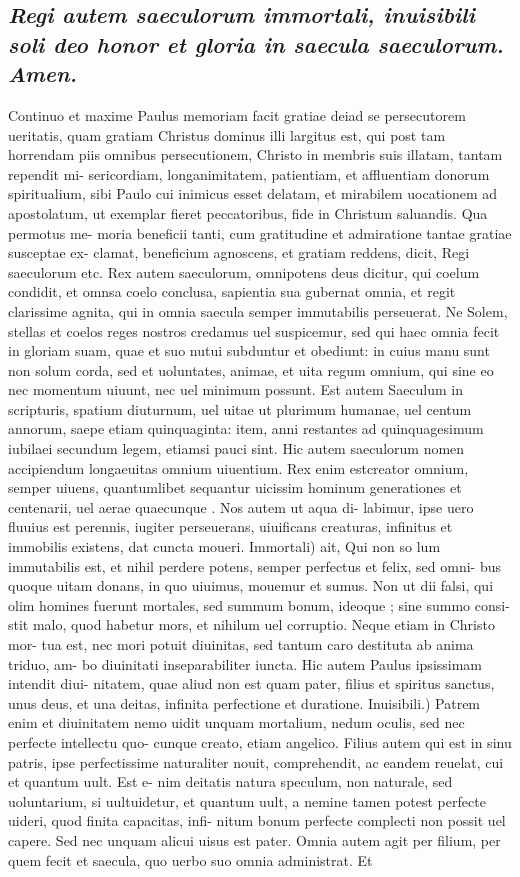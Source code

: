 \documentclass{article}
\begin{document}
\begin{pages}
\subsection*{\textit{Regi autem saeculorum immortali, inuisibili soli deo honor et gloria in saecula saeculorum. Amen. }}\pstart Continuo et maxime Paulus memoriam facit gratiae deiad se persecutorem ueritatis, quam gratiam Christus dominus illi largitus est, qui post tam horrendam piis omnibus persecutionem, Christo in membris suis illatam, tantam rependit mi- sericordiam, longanimitatem, patientiam, et affluentiam donorum spiritualium, sibi Paulo cui inimicus esset delatam, et mirabilem uocationem ad apostolatum, ut exemplar fieret peccatoribus, fide in Christum saluandis. Qua permotus me- moria beneficii tanti, cum gratitudine et admiratione tantae gratiae susceptae ex- clamat, beneficium agnoscens, et gratiam reddens, dicit, Regi saeculorum etc. Rex autem saeculorum, omnipotens deus dicitur, qui coelum condidit, et omnsa coelo conclusa, sapientia sua gubernat omnia, et regit clarissime agnita, qui in omnia saecula semper immutabilis perseuerat. Ne Solem, stellas et coelos reges nostros credamus uel suspicemur, sed qui haec omnia fecit in gloriam suam, quae et suo nutui subduntur et obediunt: in cuius manu sunt non solum corda, sed et uoluntates, animae, et uita regum omnium, qui sine eo nec momentum uiuunt, nec uel minimum possunt. Est autem Saeculum in scripturis, spatium diuturnum, uel uitae ut plurimum humanae, uel centum annorum, saepe etiam quinquaginta: item, anni restantes ad quinquagesimum iubilaei secundum legem, etiamsi pauci sint. Hic autem saeculorum nomen accipiendum longaeuitas omnium uiuentium. Rex enim estcreator omnium, semper uiuens, quantumlibet sequantur uicissim hominum generationes et centenarii, uel aerae quaecunque . Nos autem ut aqua di- labimur, ipse uero fluuius est perennis, iugiter perseuerans, uiuificans creaturas, infinitus et immobilis existens, dat cuncta moueri. Immortali) ait, Qui non so lum immutabilis est, et nihil perdere potens, semper perfectus et felix, sed omni- bus quoque uitam donans, in quo uiuimus, mouemur et sumus. Non ut dii falsi, qui olim homines fuerunt mortales, sed summum bonum, ideoque ; sine summo consi- stit malo, quod habetur mors, et nihilum uel corruptio. Neque etiam in Christo mor- tua est, nec mori potuit diuinitas, sed tantum caro destituta ab anima triduo, am- bo diuinitati inseparabiliter iuncta. Hic autem Paulus ipsissimam intendit diui- nitatem, quae aliud non est quam pater, filius et spiritus sanctus, unus deus, et una deitas, infinita perfectione et duratione. Inuisibili.) Patrem enim et diuinitatem nemo uidit unquam mortalium, nedum oculis, sed nec perfecte intellectu quo- cunque creato, etiam angelico. Filius autem qui est in sinu patris, ipse perfectissime naturaliter nouit, comprehendit, ac eandem reuelat, cui et quantum uult. Est e- nim deitatis natura speculum, non naturale, sed uoluntarium, si uultuidetur, et quantum uult, a nemine tamen potest perfecte uideri, quod finita capacitas, infi- nitum bonum perfecte complecti non possit uel capere. Sed nec unquam alicui uisus est pater. Omnia autem agit per filium, per quem fecit et saecula, quo uerbo suo omnia administrat. Et 
\end{pages}
\end{document}
